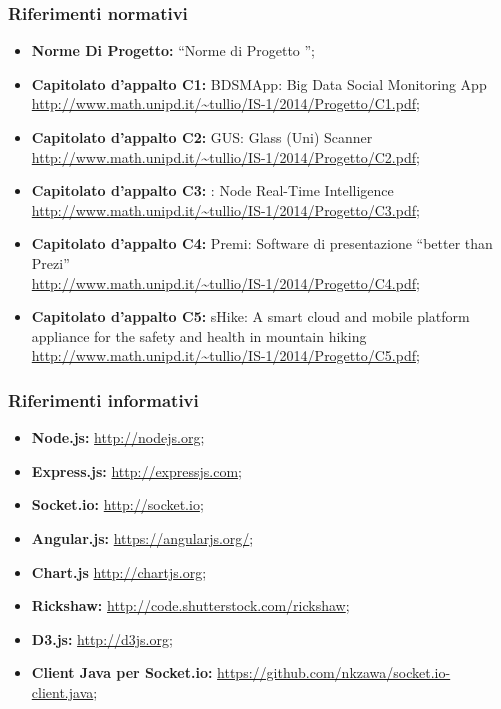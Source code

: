 		\subsubsection{Riferimenti normativi}
			\begin{itemize}
				\item \textbf{Norme Di Progetto:} ``Norme di Progetto \lastversion'';
				\item \textbf{Capitolato d'appalto C1:} BDSMApp: Big Data Social Monitoring App\\
					\url{http://www.math.unipd.it/~tullio/IS-1/2014/Progetto/C1.pdf};
				\item \textbf{Capitolato d'appalto C2:} GUS: Glass (Uni) Scanner\\
					\url{http://www.math.unipd.it/~tullio/IS-1/2014/Progetto/C2.pdf};
				\item \textbf{Capitolato d'appalto C3:} \projectname: Node Real-Time Intelligence\\
					\url{http://www.math.unipd.it/~tullio/IS-1/2014/Progetto/C3.pdf};
				\item \textbf{Capitolato d'appalto C4:} Premi: Software di presentazione ``better than Prezi''\\
					\url{http://www.math.unipd.it/~tullio/IS-1/2014/Progetto/C4.pdf};
				\item \textbf{Capitolato d'appalto C5:} sHike: A smart cloud and mobile platform appliance for the safety and health in mountain hiking\\
					\url{http://www.math.unipd.it/~tullio/IS-1/2014/Progetto/C5.pdf};
			\end{itemize}

		\subsubsection{Riferimenti informativi}
			\begin{itemize}
				\item \textbf{Node.js:} \url{http://nodejs.org};
				\item \textbf{Express.js:} \url{http://expressjs.com};
				\item \textbf{Socket.io:} \url{http://socket.io};
				\item \textbf{Angular.js:} \url{https://angularjs.org/};
				\item \textbf{Chart.js} \url{http://chartjs.org};
				\item \textbf{Rickshaw:} \url{http://code.shutterstock.com/rickshaw};
				\item \textbf{D3.js:} \url{http://d3js.org};
				\item \textbf{Client Java per Socket.io:} \url{https://github.com/nkzawa/socket.io-client.java};
			\end{itemize}